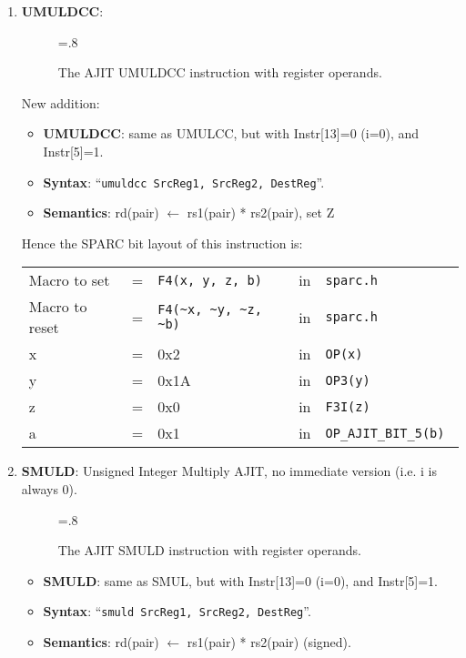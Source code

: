 \begin{enumerate}
\item \textbf{UMULDCC}:\\
  \begin{center}
    \begin{figure}[h]
      \centering
      \epsfxsize=.8\linewidth
      \caption{The AJIT UMULDCC instruction  with register operands.}
      \label{fig:ajit:umuldcc:insn}
    \end{figure}
  \end{center}
  New addition:
  \begin{itemize}
  \item []\textbf{UMULDCC}: same as UMULCC, but with Instr[13]=0 (i=0), and
    Instr[5]=1.
  \item []\textbf{Syntax}: ``\texttt{umuldcc  SrcReg1, SrcReg2, DestReg}''.
  \item []\textbf{Semantics}: rd(pair) $\leftarrow$ rs1(pair) * rs2(pair), set Z
  \end{itemize}

  Hence the SPARC bit layout of this instruction is:

  \begin{tabular}[h]{lclcl}
    Macro to set   &=& \verb|F4(x, y, z, b)|     &in& \verb|sparc.h|           \\
    Macro to reset &=& \verb|F4(~x, ~y, ~z, ~b)| &in& \verb|sparc.h|           \\
    x              &=& 0x2                       &in& \verb|OP(x) |            \\
    y              &=& 0x1A                      &in& \verb|OP3(y) |           \\
    z              &=& 0x0                       &in& \verb|F3I(z) |           \\
    a              &=& 0x1                       &in& \verb|OP_AJIT_BIT_5(b) |
  \end{tabular}

\item \textbf{SMULD}: Unsigned Integer Multiply AJIT, no immediate
  version (i.e. i is always 0).\\
  \begin{center}
    \begin{figure}[h]
      \centering
      \epsfxsize=.8\linewidth
      \caption{The AJIT SMULD instruction  with register operands.}
      \label{fig:ajit:smuld:insn}
    \end{figure}
  \end{center}
  \begin{itemize}
  \item []\textbf{SMULD}: same as SMUL, but with Instr[13]=0 (i=0), and
    Instr[5]=1.
  \item []\textbf{Syntax}: ``\texttt{smuld  SrcReg1, SrcReg2, DestReg}''.
  \item []\textbf{Semantics}: rd(pair) $\leftarrow$ rs1(pair) *
    rs2(pair) (signed).
  \end{itemize}


\end{enumerate}
